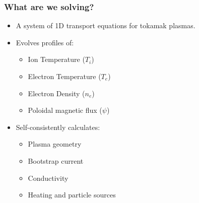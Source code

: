 \documentclass[10pt,aspectratio=169]{beamer}
\begin{document}
\begin{frame}
  
\end{frame}

\begin{frame}
  \frametitle{What are we solving?}
  \begin{itemize}
    \item A system of 1D transport equations for tokamak plasmas.
    \item Evolves profiles of:
    \begin{itemize}
        \item Ion Temperature ($T_i$)
        \item Electron Temperature ($T_e$)
        \item Electron Density ($n_e$)
        \item Poloidal magnetic flux ($\psi$)
    \end{itemize}
    \item Self-consistently calculates:
    \begin{itemize}
        \item Plasma geometry
        \item Bootstrap current
        \item Conductivity
        \item Heating and particle sources
    \end{itemize}
  \end{itemize}
\end{frame}

\begin{frame}[allowframebreaks]
  
  
  \nocite{*}
\end{frame}
\end{document}
